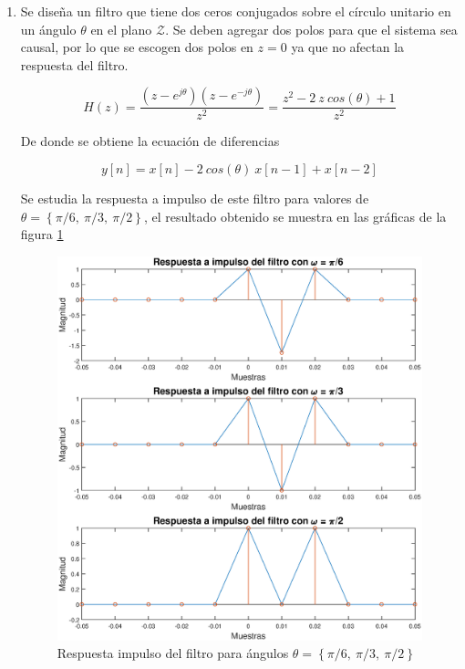 \begin{enumerate}
    \item Se diseña un filtro que tiene dos ceros conjugados sobre el círculo unitario en un ángulo $\theta$ en el plano $\mathcal{Z}$. Se deben agregar dos polos para que el sistema sea causal, por lo que se escogen dos polos en $z = 0$ ya que no afectan la respuesta del filtro.
    
    $$ H(z) = \frac{(z- e^{j \theta})(z-e^{-j \theta})}{z^2} = \frac{z^2 - 2~z~cos(\theta)+ 1}{z^2}$$
    
    De donde se obtiene  la ecuación de diferencias 
    
    $$ y[n] = x[n] -2~cos(\theta )~ x[n-1] + x[n-2]$$
    
    
        Se estudia  la respuesta  a impulso de este filtro para valores de $ \theta = \left \lbrace \pi/6,~ \pi/3,~\pi/2 \right \rbrace$, el resultado obtenido se muestra en las gráficas de la figura \ref{resp_impuilso}
        
        \begin{figure}[H]
            \centering
            \includegraphics[scale = 0.5]{Figuras/p1_1-Respuesta_impulso.eps}
            \caption{Respuesta impulso del filtro para ángulos $ \theta = \left \lbrace \pi/6,~ \pi/3,~\pi/2 \right \rbrace$}
            \label{resp_impuilso}
        \end{figure}
    

\end{enumerate}
